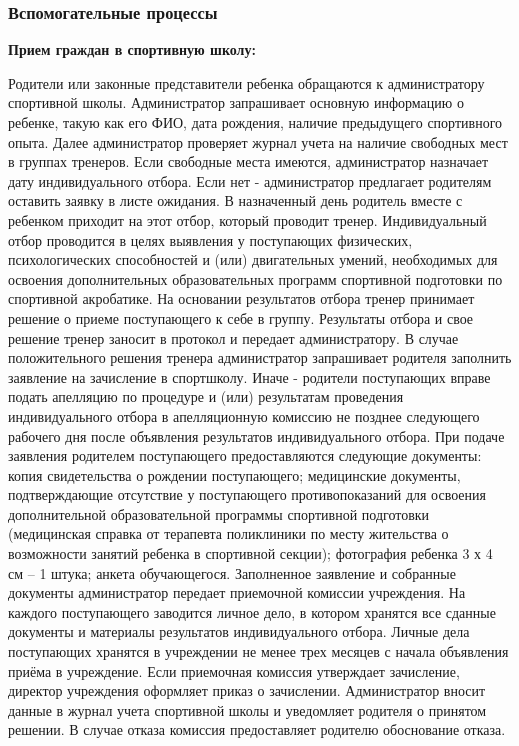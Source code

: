 \documentclass[12pt,a4paper,final]{article} %
\begin{document}
\subsubsection{Вспомогательные процессы}
\par \textbf{Прием граждан в спортивную школу:} 
\par Родители или законные представители ребенка обращаются к администратору спортивной школы. Администратор запрашивает основную информацию о ребенке, такую как его ФИО, дата рождения, наличие предыдущего спортивного опыта. Далее администратор проверяет журнал учета на наличие свободных мест в группах тренеров. Если свободные места имеются, администратор назначает дату индивидуального отбора.  Если нет - администратор предлагает родителям оставить заявку в листе ожидания. В назначенный день родитель вместе с ребенком приходит на этот отбор, который проводит тренер. Индивидуальный отбор проводится в целях выявления у поступающих физических, психологических способностей и (или) двигательных умений, необходимых для освоения дополнительных образовательных программ спортивной подготовки по спортивной акробатике. На основании результатов отбора тренер принимает решение о приеме поступающего к себе в группу. Результаты отбора и свое решение тренер заносит в протокол и передает администратору. В случае положительного решения тренера администратор запрашивает родителя заполнить заявление на зачисление в спортшколу.  Иначе - родители поступающих вправе подать апелляцию по процедуре и (или) результатам проведения индивидуального отбора в апелляционную комиссию не позднее следующего рабочего дня после объявления результатов индивидуального отбора. При подаче заявления родителем поступающего предоставляются следующие документы: копия свидетельства о рождении поступающего; медицинские документы, подтверждающие отсутствие у поступающего противопоказаний для освоения дополнительной образовательной программы спортивной подготовки (медицинская справка от терапевта поликлиники по месту жительства о возможности занятий ребенка в спортивной секции); фотография ребенка 3 х 4 см – 1 штука; анкета обучающегося. Заполненное заявление и собранные документы администратор передает приемочной комиссии учреждения. На каждого поступающего заводится личное дело, в котором хранятся все
сданные документы и материалы результатов индивидуального отбора.
Личные дела поступающих хранятся в учреждении не менее трех месяцев с
начала объявления приёма в учреждение. Если приемочная комиссия утверждает зачисление, директор учреждения оформляет приказ о зачислении. Администратор вносит данные в журнал учета спортивной школы и уведомляет родителя о принятом решении. В случае отказа комиссия предоставляет родителю обоснование отказа. \\
\end{document}
